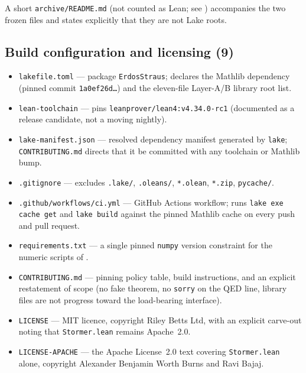 \documentclass[11pt]{article}
\theoremstyle{plain}
\theoremstyle{definition}
\theoremstyle{remark}
\newcommand{\file}[1]{\texttt{#1}}
\newcommand{\lean}[1]{\texttt{#1}}
\renewcommand{\_}{\textunderscore\allowbreak}
\begin{document}
\endgroup
\noindent A short \texttt{archive/README.md} (not counted as Lean; see )
accompanies the two frozen files and states explicitly that they are not Lake roots.

\subsection{Build configuration and licensing (9)}
\begin{itemize}[leftmargin=1.6em]
  \item \file{lakefile.toml} --- package \texttt{ErdosStraus}; declares the Mathlib dependency
        (pinned commit \texttt{1a0ef26d\dots}) and the eleven-file Layer-A/B library root list.
  \item \file{lean-toolchain} --- pins \texttt{leanprover/lean4:v4.34.0-rc1} (documented as a
        release candidate, not a moving nightly).
  \item \file{lake-manifest.json} --- resolved dependency manifest generated by \texttt{lake};
        \file{CONTRIBUTING.md} directs that it be committed with any toolchain or Mathlib bump.
  \item \file{.gitignore} --- excludes \texttt{.lake/}, \texttt{.oleans/}, \texttt{*.olean},
        \texttt{*.zip}, \texttt{\_\_pycache\_\_/}.
  \item \file{.github/workflows/ci.yml} --- GitHub Actions workflow; runs \texttt{lake exe cache
        get} and \texttt{lake build} against the pinned Mathlib cache on every push and pull
        request.
  \item \file{requirements.txt} --- a single pinned \texttt{numpy} version constraint for the
        numeric scripts of .
  \item \file{CONTRIBUTING.md} --- pinning policy table, build instructions, and an explicit
        restatement of scope (no fake theorem, no \texttt{sorry} on the QED line, library files
        are not progress toward the load-bearing interface).
  \item \file{LICENSE} --- MIT licence, copyright Riley Betts Ltd, with an explicit carve-out
        noting that \lean{Stormer.lean} remains Apache~2.0.
  \item \file{LICENSE-APACHE} --- the Apache License~2.0 text covering \lean{Stormer.lean}
        alone, copyright Alexander Benjamin Worth Burns and Ravi Bajaj.
\end{itemize}
\end{document}

